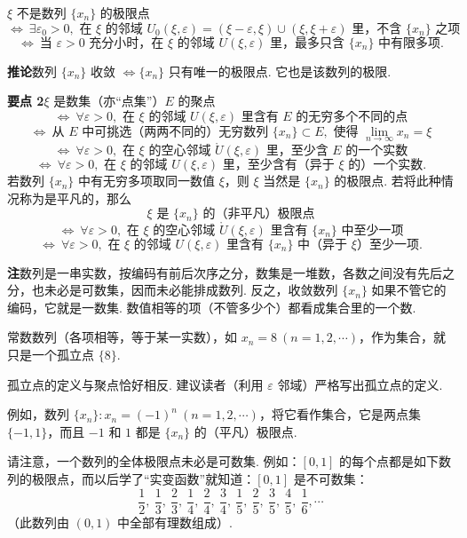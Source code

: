 \documentclass[UTF8,12pt,a4paper,fontset=fandol]{ctexart}
\begin{document}
$\xi$ 不是数列 $\{x_n\}$ 的极限点
\[
\Longleftrightarrow\ \exists\varepsilon_0>0,\text{ 在 }\xi\text{ 的邻域 }U_0(\xi,\varepsilon)=(\xi-\varepsilon,\xi)\cup(\xi,\xi+\varepsilon)\text{ 里，不含 }\{x_n\}\text{ 之项}
\]
\[
\Longleftrightarrow\ \text{当 }\varepsilon>0\text{ 充分小时，在 }\xi\text{ 的邻域 }U(\xi,\varepsilon)\text{ 里，最多只含 }\{x_n\}\text{ 中有限多项}.
\]

\noindent\textbf{推论}\quad 数列 $\{x_n\}$ 收敛 $\Longleftrightarrow \{x_n\}$ 只有唯一的极限点. 它也是该数列的极限.

\noindent\textbf{要点 2}\quad $\xi$ 是数集（亦“点集”）$E$ 的聚点
\[
\Longleftrightarrow\ \forall \varepsilon>0,\text{ 在 }\xi\text{ 的邻域 }U(\xi,\varepsilon)\text{ 里含有 }E\text{ 的无穷多个不同的点}
\]
\[
\Longleftrightarrow\ \text{从 }E\text{ 中可挑选（两两不同的）无穷数列 }\{x_n\}\subset E,\text{ 使得 }\lim_{n\to\infty}x_n=\xi
\]
\[
\Longleftrightarrow\ \forall \varepsilon>0,\text{ 在 }\xi\text{ 的空心邻域 }\mathring{U}(\xi,\varepsilon)\text{ 里，至少含 }E\text{ 的一个实数}
\]
\[
\Longleftrightarrow\ \forall \varepsilon>0,\text{ 在 }\xi\text{ 的邻域 }U(\xi,\varepsilon)\text{ 里，至少含有（异于 }\xi\text{ 的）一个实数}.
\]
若数列 $\{x_n\}$ 中有无穷多项取同一数值 $\xi$，则 $\xi$ 当然是 $\{x_n\}$ 的极限点. 若将此种情况称为是平凡的，那么
\[
  \xi\text{ 是 }\{x_n\}\text{ 的（非平凡）极限点}
\]
\[
\Longleftrightarrow\ \forall \varepsilon>0,\text{ 在 }\xi\text{ 的空心邻域 }\mathring{U}(\xi,\varepsilon)\text{ 里含有 }\{x_n\}\text{ 中至少一项}
\]
\[
\Longleftrightarrow\ \forall \varepsilon>0,\text{ 在 }\xi\text{ 的邻域 }U(\xi,\varepsilon)\text{ 里含有 }\{x_n\}\text{ 中（异于 }\xi\text{）至少一项}.
\]

\noindent\textbf{注}\quad 数列是一串实数，按编码有前后次序之分，数集是一堆数，各数之间没有先后之分，也未必是可数集，因而未必能排成数列. 反之，收敛数列 $\{x_n\}$ 如果不管它的编码，它就是一数集. 数值相等的项（不管多少个）都看成集合里的一个数.

常数数列（各项相等，等于某一实数），如 $x_n=8\ (n=1,2,\cdots)$，作为集合，就只是一个孤立点 $\{8\}$.

孤立点的定义与聚点恰好相反. 建议读者（利用 $\varepsilon$ 邻域）严格写出孤立点的定义.

例如，数列 $\{x_n\}:x_n=(-1)^n\ (n=1,2,\cdots)$，将它看作集合，它是两点集 $\{-1,1\}$，而且 $-1$ 和 $1$ 都是 $\{x_n\}$ 的（平凡）极限点.

请注意，一个数列的全体极限点未必是可数集. 例如：$[0,1]$ 的每个点都是如下数列的极限点，而以后学了“实变函数”就知道：$[0,1]$ 是不可数集：
\[
  \frac12,\ \frac13,\ \frac23,\ \frac14,\ \frac24,\ \frac34,\ \frac15,\ \frac25,\ \frac35,\ \frac45,\ \frac16,\cdots
\]
（此数列由 $(0,1)$ 中全部有理数组成）.
\end{document}
